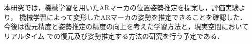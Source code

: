 本研究では，機械学習を用いたARマーカの位置姿勢推定を提案し，評価実験より，
機械学習によって変形したARマーカの姿勢を推定できることを確認した．
今後は復元精度と姿勢推定の精度の向上を考えた学習方法と，現実空間においてリアルタイム
での復元及び姿勢推定する方法の研究を行う予定である．